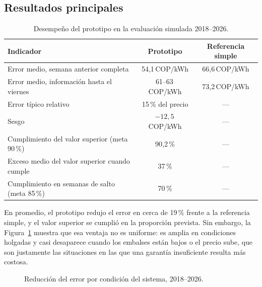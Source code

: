 \documentclass[11pt,letterpaper]{article}
\newcommand{\cop}{\,COP/kWh}
\begin{document}
\subsection{Resultados principales}

\begin{table}[H]
\centering
\caption{Desempeño del prototipo en la evaluación simulada 2018--2026.}
\label{tab:resultados}
\small
\begin{tabular}{@{}lcc@{}}
\toprule
\textbf{Indicador} & \textbf{Prototipo} & \textbf{Referencia simple} \\
\midrule
Error medio, semana anterior completa & 54,1\cop & 66,6\cop \\
Error medio, información hasta el viernes & 61--63\cop & 73,2\cop \\
Error típico relativo & 15\,\% del precio & --- \\
Sesgo & $-12{,}5$\cop & --- \\
Cumplimiento del valor superior (meta 90\,\%) & 90,2\,\% & --- \\
Exceso medio del valor superior cuando cumple & 37\,\% & --- \\
Cumplimiento en semanas de salto (meta 85\,\%) & 70\,\% & --- \\
\bottomrule
\end{tabular}
\end{table}

En promedio, el prototipo redujo el error en cerca de 19\,\% frente a la
referencia simple, y el valor superior se cumplió en la proporción
prevista. Sin embargo, la Figura~\ref{fig:regimenes} muestra que esa
ventaja no es uniforme: es amplia en condiciones holgadas y casi
desaparece cuando los embalses están bajos o el precio sube, que son
justamente las situaciones en las que una garantía insuficiente resulta
más costosa.

\begin{figure}[H]
\centering
{}
\caption{Reducción del error por condición del sistema, 2018--2026.}
\label{fig:regimenes}
\end{figure}
\end{document}
